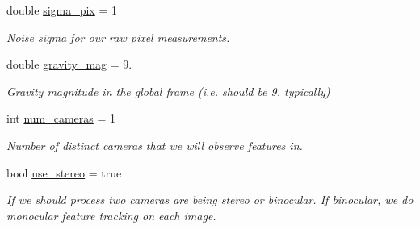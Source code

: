 \begin{DoxyCompactItemize}
\mbox{\label{structov__init_1_1InertialInitializerOptions_ac10140226c97ac5b92f6f72a1f2134df}} 
double \hyperlink{structov__init_1_1InertialInitializerOptions_ac10140226c97ac5b92f6f72a1f2134df}{sigma\+\_\+pix} = 1
\begin{DoxyCompactList}\small\item\em Noise sigma for our raw pixel measurements. \end{DoxyCompactList}\item 
\mbox{\label{structov__init_1_1InertialInitializerOptions_a94b223e0b714d700d3b489b3918b002d}} 
double \hyperlink{structov__init_1_1InertialInitializerOptions_a94b223e0b714d700d3b489b3918b002d}{gravity\+\_\+mag} = 9.
\begin{DoxyCompactList}\small\item\em Gravity magnitude in the global frame (i.\+e. should be 9. typically) \end{DoxyCompactList}\item 
\mbox{\label{structov__init_1_1InertialInitializerOptions_a6525a195b4ba524597a0031fa23f65af}} 
int \hyperlink{structov__init_1_1InertialInitializerOptions_a6525a195b4ba524597a0031fa23f65af}{num\+\_\+cameras} = 1
\begin{DoxyCompactList}\small\item\em Number of distinct cameras that we will observe features in. \end{DoxyCompactList}\item 
\mbox{\label{structov__init_1_1InertialInitializerOptions_ac0e008a72e6fb14ac129fae7ae62e05b}} 
bool \hyperlink{structov__init_1_1InertialInitializerOptions_ac0e008a72e6fb14ac129fae7ae62e05b}{use\+\_\+stereo} = true
\begin{DoxyCompactList}\small\item\em If we should process two cameras are being stereo or binocular. If binocular, we do monocular feature tracking on each image. \end{DoxyCompactList}\item 
\mbox{\label{structov__init_1_1InertialInitializerOptions_a7bae4984f5ae2416c12a4aa4895018a4}} 

\end{DoxyCompactItemize}
